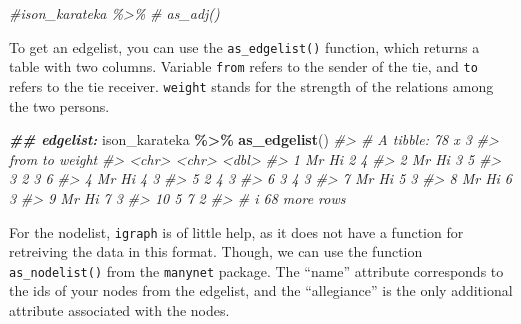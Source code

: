 \documentclass[
]{book}
\newenvironment{Shaded}{\begin{snugshade}}{\end{snugshade}}
\newcommand{\CommentTok}[1]{\textcolor[rgb]{0.56,0.35,0.01}{\textit{#1}}}
\newcommand{\DocumentationTok}[1]{\textcolor[rgb]{0.56,0.35,0.01}{\textbf{\textit{#1}}}}
\newcommand{\FunctionTok}[1]{\textcolor[rgb]{0.13,0.29,0.53}{\textbf{#1}}}
\newcommand{\NormalTok}[1]{#1}
\newcommand{\SpecialCharTok}[1]{\textcolor[rgb]{0.81,0.36,0.00}{\textbf{#1}}}
\begin{document}
\begin{Shaded}
\begin{Highlighting}[]
\CommentTok{\#ison\_karateka \%\textgreater{}\% }
\CommentTok{\#  as\_adj()}
\end{Highlighting}
\end{Shaded}

To get an edgelist, you can use the \texttt{as\_edgelist()} function, which returns a table with two columns. Variable \texttt{from} refers to the sender of the tie, and \texttt{to} refers to the tie receiver. \texttt{weight} stands for the strength of the relations among the two persons.

\begin{Shaded}
\begin{Highlighting}[]
\DocumentationTok{\#\# edgelist:}
\NormalTok{ison\_karateka }\SpecialCharTok{\%\textgreater{}\%} 
  \FunctionTok{as\_edgelist}\NormalTok{()}
\CommentTok{\#\textgreater{} \# A tibble: 78 x 3}
\CommentTok{\#\textgreater{}    from  to    weight}
\CommentTok{\#\textgreater{}    \textless{}chr\textgreater{} \textless{}chr\textgreater{}  \textless{}dbl\textgreater{}}
\CommentTok{\#\textgreater{}  1 Mr Hi 2          4}
\CommentTok{\#\textgreater{}  2 Mr Hi 3          5}
\CommentTok{\#\textgreater{}  3 2     3          6}
\CommentTok{\#\textgreater{}  4 Mr Hi 4          3}
\CommentTok{\#\textgreater{}  5 2     4          3}
\CommentTok{\#\textgreater{}  6 3     4          3}
\CommentTok{\#\textgreater{}  7 Mr Hi 5          3}
\CommentTok{\#\textgreater{}  8 Mr Hi 6          3}
\CommentTok{\#\textgreater{}  9 Mr Hi 7          3}
\CommentTok{\#\textgreater{} 10 5     7          2}
\CommentTok{\#\textgreater{} \# i 68 more rows}
\end{Highlighting}
\end{Shaded}

For the nodelist, \texttt{igraph} is of little help, as it does not have a function for retreiving the data in this format. Though, we can use the function \texttt{as\_nodelist()} from the \texttt{manynet} package. The ``name'' attribute corresponds to the ids of your nodes from the edgelist, and the ``allegiance'' is the only additional attribute associated with the nodes.
\end{document}
